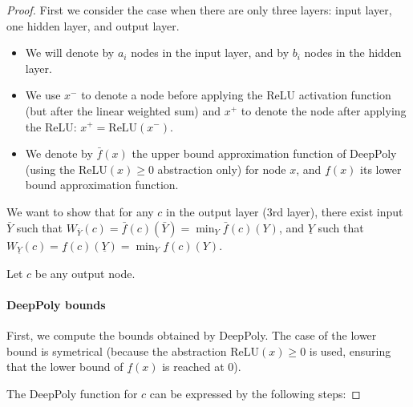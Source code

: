 \documentclass[]{article}
\theoremstyle{definition}
\newcommand{\ReLU}{\mathrm{ReLU}}
\begin{document}
\begin{proof}

	First we consider the case when there are only three layers: input layer, one hidden layer, and output layer. 





\begin{itemize}
    \item We will denote by $a_i$ nodes in the input layer, and by $b_i$ nodes in the hidden layer.

	\item We use $x^-$ to denote a node before applying the ReLU activation function (but after the linear weighted sum) and $x^+$ to denote the node after applying the ReLU: $x^+ = \ReLU(x^-)$.
	
	\item We denote by $\bar{f}(x)$ the upper bound approximation function of DeepPoly (using the ReLU$(x) \geq 0$ abstraction only) for node $x$, 
	and $\underline{f}(x)$ its lower bound approximation function.
\end{itemize}

We want to show that for any $c$ in the output layer (3rd layer), there exist 
input $\bar{Y}$ such that $W_{\bar{Y}}(c) = \bar{f}(c)(\bar{Y}) = \min_Y \bar{f}(c)(Y)$, and 
 $\underline{Y}$ such that $W_{\underline{Y}}(c) = \underline{f}(c)(\underline{Y}) = \min_Y \underline{f}(c)(Y)$.

Let $c$ be any output node.


\paragraph{DeepPoly bounds} 

First, we compute the bounds obtained by DeepPoly.
The case of the lower bound is symetrical (because the abstraction ReLU$(x)\geq 0$ is used, ensuring that the lower bound of $\underline{f}(x)$ is reached at 0). 

The DeepPoly function for $c$ can be expressed by the following steps:


\end{proof}
\end{document}

